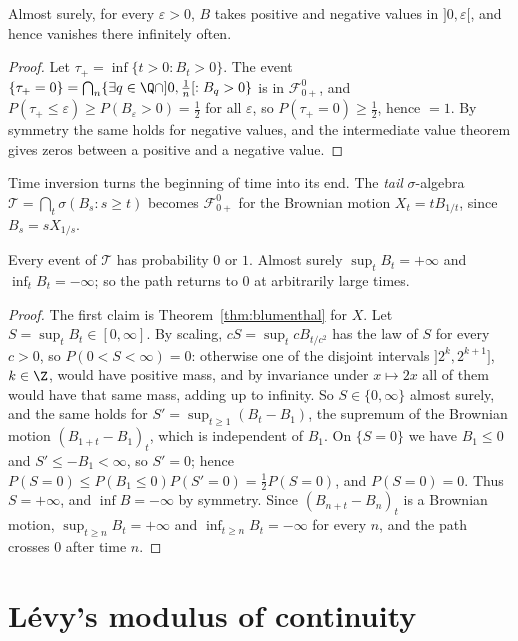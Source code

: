 \begin{corollary}\label{cor:oscillate}
Almost surely, for every $\varepsilon>0$, $B$ takes positive and negative values in $]0,\varepsilon[$, and hence vanishes there infinitely often.
\end{corollary}

\begin{proof}
Let $\tau_+=\inf\{t>0:B_t>0\}$. The event $\{\tau_+=0\}=\bigcap_n\{\exists q\in\Q\cap]0,\frac1n[:B_q>0\}$ is in $\mathcal F^0_{0+}$, and $P(\tau_+\le\varepsilon)\ge P(B_\varepsilon>0)=\frac12$ for all $\varepsilon$, so
$P(\tau_+=0)\ge\frac12$, hence $=1$. By symmetry the same holds for negative values, and the intermediate value theorem gives zeros between a positive and a negative value.
\end{proof}

Time inversion turns the beginning of time into its end. The \emph{tail} $\sigma$-algebra $\mathcal T=\bigcap_t\sigma(B_s:s\ge t)$ becomes $\mathcal F^0_{0+}$ for the Brownian motion $X_t=tB_{1/t}$, since $B_s=sX_{1/s}$.

\begin{corollary}\label{cor:infinity}
Every event of $\mathcal T$ has probability $0$ or $1$. Almost surely $\sup_tB_t=+\infty$ and $\inf_tB_t=-\infty$; so the path returns to $0$ at arbitrarily large times.
\end{corollary}

\begin{proof}
The first claim is Theorem~\ref{thm:blumenthal} for $X$. Let $S=\sup_tB_t\in[0,\infty]$. By scaling, $cS=\sup_tcB_{t/c^2}$ has the law of $S$ for every $c>0$, so $P(0<S<\infty)=0$: otherwise one of the disjoint intervals $]2^k,2^{k+1}]$, $k\in\Z$, would have positive mass, and by invariance under $x\mapsto2x$ all of them would have that same mass,
adding up to infinity. So $S\in\{0,\infty\}$ almost surely, and the same holds for $S'=\sup_{t\ge1}(B_t-B_1)$, the supremum of the Brownian motion $(B_{1+t}-B_1)_t$, which is independent of $B_1$. On
$\{S=0\}$ we have $B_1\le0$ and $S'\le-B_1<\infty$, so $S'=0$; hence $P(S=0)\le P(B_1\le0)P(S'=0)=\frac12P(S=0)$, and $P(S=0)=0$. Thus $S=+\infty$, and $\inf B=-\infty$ by symmetry. Since
$(B_{n+t}-B_n)_t$ is a Brownian motion, $\sup_{t\ge n}B_t=+\infty$ and $\inf_{t\ge n}B_t=-\infty$ for every $n$, and the path crosses $0$ after time $n$.
\end{proof}

\section{L\'evy's modulus of continuity}

